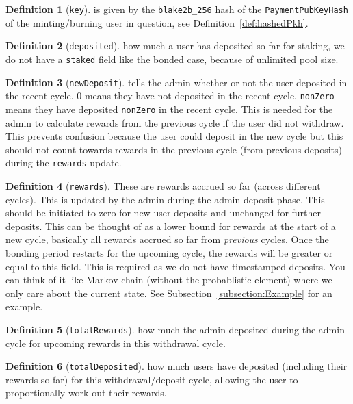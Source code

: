 \documentclass[10pt, a4paper]{article}
\theoremstyle{definition}
\newtheorem{definition}{Definition}[section]
\begin{document}
\begin{definition}[\texttt{key}]\label{def:key}
is given by the \texttt{blake2b\_256} hash of the \texttt{PaymentPubKeyHash} of the minting/burning user in question, see Definition~\ref{def:hashedPkh}. 
\end{definition}

\begin{definition}[\texttt{deposited}]\label{def:deposited} how much a user has deposited so far for staking, we do not have a \texttt{staked} field like the bonded case, because of unlimited pool size.
\end{definition}

\begin{definition}[\texttt{newDeposit}]\label{def:newDeposit} tells the admin whether or not the user deposited in the recent cycle. 0 means they have not deposited in the recent cycle, \texttt{nonZero} means they have deposited \texttt{nonZero} in the recent cycle. This is needed for the admin to calculate rewards from the previous cycle if the user did not withdraw. This prevents confusion because the user could deposit in the new cycle but this should not count towards rewards in the previous cycle (from previous deposits) during the \texttt{rewards} update.
\end{definition}

\begin{definition}[\texttt{rewards}]\label{def:rewards}
These are rewards accrued so far (across different cycles). This is updated by the admin during the admin deposit phase. This should be initiated to zero for new user deposits and unchanged for further deposits. This can be thought of as a lower bound for rewards at the start of a new cycle, basically all rewards accrued so far from \textit{previous} cycles. Once the bonding period restarts for the upcoming cycle, the rewards will be greater or equal to this field. This is required as we do not have timestamped deposits. You can think of it like Markov chain (without the probablistic element) where we only care about the current state. See Subsection~\ref{subsection:Example} for an example.
\end{definition}

\begin{definition}[\texttt{totalRewards}]\label{def:totalRewards} how much the admin deposited during the admin cycle for upcoming rewards in this withdrawal cycle.
\end{definition}

\begin{definition}[\texttt{totalDeposited}]\label{def:totalDeposited} how much users have deposited (including their rewards so far) for this withdrawal/deposit cycle, allowing the user to proportionally work out their rewards.
\end{definition}
\end{document}
